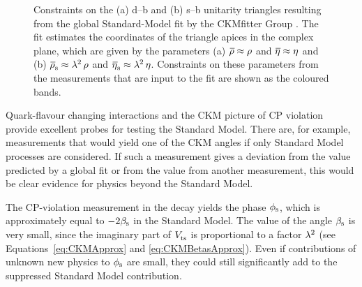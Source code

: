 \begin{figure}[tb]
\begin{subfigure}{0.495\textwidth}
    \caption{}
  \end{subfigure}
  \caption{Constraints on the (a) d--b and (b) s--b unitarity triangles resulting from the global Standard-Model fit by the CKMfitter Group
           \cite{Charles:2004jd}. The fit estimates the coordinates of the triangle apices in the complex plane, which are given by the
	   parameters (a) $\rhobar\approx\rho$ and $\etabar\approx\eta$ and (b) $\rhosbar\approx\lam^2\,\rho$ and
           $\etasbar\approx\lam^2\,\eta$.
           Constraints on these parameters from the measurements that are input to the fit are shown as the coloured bands.}
  \label{fig:unitTriangleMeas}
\end{figure}

Quark-flavour changing interactions and the CKM picture of CP violation provide excellent probes for testing the Standard Model. There are,
for example, measurements that would yield one of the CKM angles if only Standard Model processes are considered. If such a measurement
gives a deviation from the value predicted by a global fit or from the value from another measurement, this would be clear evidence for
physics beyond the Standard Model.

The CP-violation measurement in the \BstoJpsiphi{} decay yields the phase $\phi_\text{s}$, which is approximately equal to $-2\beta_\text{s}$ in the Standard
Model. The value of the angle $\beta_\text{s}$ is very small, since the imaginary part of $\Vts$ is proportional to a factor $\lambda^2$ (see
Equations~\ref{eq:CKMApprox} and \ref{eq:CKMBetasApprox}). Even if contributions of unknown new physics to $\phi_\text{s}$ are small, they could
still significantly add to the suppressed Standard Model contribution.
